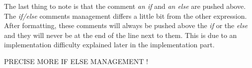 The last thing to note is that the comment \emph{an if} and \emph{an else} are pushed above. The \emph{if/else} comments management differs a little bit from the other expression. After formatting, these comments will always be pushed above the \textit{if} or the \emph{else} and they will never be at the end of the line next to them. This is due to an implementation difficulty explained later in the implementation part.


PRECISE MORE IF ELSE MANAGEMENT !




